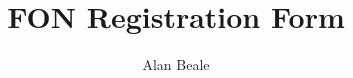 \documentclass[12pt,
notumble,
letterpaper]{leaflet}
\title{FON Registration Form}
\author{Alan Beale}
\date{}
\begin{document}

\pagebreak

\pagebreak

\pagebreak

\pagebreak

\pagebreak

\pagebreak
\end{document}
